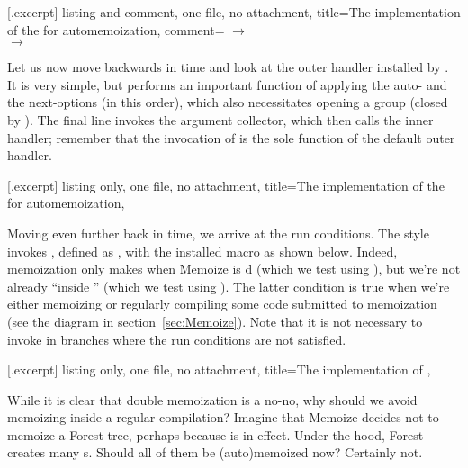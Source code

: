 \documentclass[a4paper,11pt]{article}
\begin{document}
[.excerpt]{%
  listing and comment, one file, no attachment,
  title={The implementation of the 
    for automemoization},
  comment={%
    $\rightarrow$ %
    \\
    $\rightarrow$ %
  }
}

Let us now move backwards in time and look at the outer handler installed by
.  It is very simple, but performs an important function of
applying the auto- and the next-options (in this order), which also
necessitates opening a group (closed by ).  The final line
invokes the argument collector, which then calls the inner handler; remember
that the invocation of  is the sole function of the
default outer handler.

[.excerpt]{%
  listing only, one file, no attachment,
  title={The implementation of the 
    for automemoization},
}

Moving even further back in time, we arrive at the run conditions.  The
 style invokes ,
defined as , with
the installed macro as shown below.  Indeed, memoization only makes when
Memoize is d (which we test using ), but we're
not already ``inside '' (which we test using
).  The latter condition is true when we're either
memoizing or regularly compiling some code submitted to memoization (see the
diagram in section~\ref{sec:Memoize}).  Note that it is not necessary to invoke
 in branches where the run conditions are not satisfied.

[.excerpt]{%
  listing only, one file, no attachment,
  title={The implementation of 
    },
}

While it is clear that double memoization is a no-no, why should we avoid
memoizing inside a regular compilation?  Imagine that Memoize decides not to
memoize a Forest tree, perhaps because  is in effect.  Under
the hood, Forest creates many s.  Should all of them be
(auto)memoized now? Certainly not.
\end{document}
